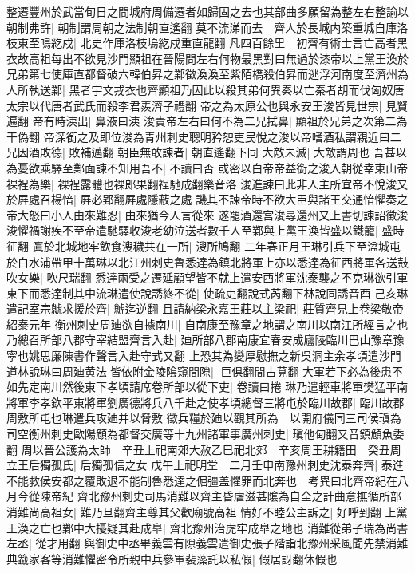 整遷豐州於武當旬日之間城府周備遷者如歸固之去也其部曲多願留為整左右整諭以朝制弗許|{
	朝制謂周朝之法制朝直遙翻}
莫不流涕而去　齊人於長城内築重城自庫洛枝東至鳴紇戍|{
	北史作庫洛枝塢紇戍重直龍翻}
凡四百餘里　初齊有術士言亡高者黑衣故高祖每出不欲見沙門顯祖在晉陽問左右何物最黑對曰無過於漆帝以上黨王渙於兄弟第七使庫直都督破六韓伯昇之鄴徵渙渙至紫陌橋殺伯昇而逃浮河南度至濟州為人所執送鄴|{
	黑者宇文戎衣也齊顯祖乃因此以殺其弟何異秦以亡秦者胡而伐匈奴唐太宗以代唐者武氏而殺李君羨濟子禮翻}
帝之為太原公也與永安王浚皆見世宗|{
	見賢遍翻}
帝有時洟出|{
	鼻液曰洟}
浚責帝左右曰何不為二兄拭鼻|{
	顯祖於兄弟之次第二為干偽翻}
帝深銜之及即位浚為青州刺史聰明矜恕吏民悅之浚以帝嗜酒私謂親近曰二兄因酒敗德|{
	敗補邁翻}
朝臣無敢諫者|{
	朝直遙翻下同}
大敵未滅|{
	大敵謂周也}
吾甚以為憂欲乘驛至鄴面諫不知用吾不|{
	不讀曰否}
或密以白帝帝益銜之浚入朝從幸東山帝裸裎為樂|{
	裸裎露體也裸郎果翻䄇馳成翻樂音洛}
浚進諫曰此非人主所宜帝不悅浚又於屛處召楊愔|{
	屛必郢翻屛處隱蔽之處}
譏其不諫帝時不欲大臣與諸王交通愔懼奏之帝大怒曰小人由來難忍|{
	由來猶今人言從來}
遂罷酒還宫浚尋還州又上書切諫詔徵浚浚懼禍謝疾不至帝遣馳驛收浚老幼泣送者數千人至鄴與上黨王渙皆盛以鐵籠|{
	盛時征翻}
寘於北城地牢飲食溲穢共在一所|{
	溲所鳩翻}
二年春正月王琳引兵下至湓城屯於白水浦帶甲十萬琳以北江州刺史魯悉達為鎮北將軍上亦以悉達為征西將軍各送鼓吹女樂|{
	吹尺瑞翻}
悉達兩受之遷延顧望皆不就上遣安西將軍沈泰襲之不克琳欲引軍東下而悉達制其中流琳遣使說誘終不從|{
	使疏吏翻說式芮翻下林說同誘音酉}
己亥琳遣記室宗虩求援於齊|{
	虩迄逆翻}
且請納梁永嘉王莊以主梁祀|{
	莊質齊見上卷梁敬帝紹泰元年}
衡州刺史周廸欲自據南川|{
	自南康至豫章之地謂之南川以南江所經言之也}
乃總召所部八郡守宰結盟齊言入赴|{
	廸所部八郡南康宜春安成廬陵臨川巴山豫章豫寜也姚思廉陳書作聲言入赴守式又翻}
上恐其為變厚慰撫之新吳洞主余孝頃遣沙門道林說琳曰周廸黄法皆依附金陵隂窺間隙|{
	巨俱翻間古莧翻}
大軍若下必為後患不如先定南川然後東下孝頃請席卷所部以從下吏|{
	卷讀曰捲}
琳乃遣輕車將軍樊猛平南將軍李孝欽平東將軍劉廣德將兵八千赴之使孝頃總督三將屯於臨川故郡|{
	臨川故郡周敷所屯也琳遣兵攻廸并以脅敷}
徵兵糧於廸以觀其所為　以開府儀同三司侯瑱為司空衡州刺史歐陽頠為都督交廣等十九州諸軍事廣州刺史|{
	瑱他甸翻又音鎮頠魚委翻}
周以晉公護為太師　辛丑上祀南郊大赦乙巳祀北郊　辛亥周王耕籍田　癸丑周立王后獨孤氏|{
	后獨孤信之女}
戊午上祀明堂　二月壬申南豫州刺史沈泰奔齊|{
	泰進不能救侯安都之覆敗退不能制魯悉達之倔彊盖懼罪而北奔也　考異曰北齊帝紀在八月今從陳帝紀}
齊北豫州刺史司馬消難以齊主昏虐滋甚隂為自全之計曲意撫循所部消難尚高祖女|{
	難乃旦翻齊主尊其父歡廟號高祖}
情好不睦公主訴之|{
	好呼到翻}
上黨王渙之亡也鄴中大擾疑其赴成臯|{
	齊北豫州治虎牢成臯之地也}
消難從弟子瑞為尚書左丞|{
	從才用翻}
與御史中丞畢義雲有隙義雲遣御史張子階詣北豫州采風聞先禁消難典籖家客等消難懼密令所親中兵參軍裴藻託以私假|{
	假居訝翻休假也}
